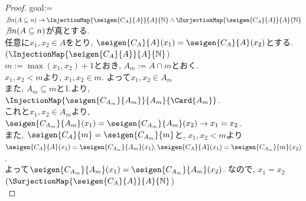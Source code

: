 \begin{proof}
 goal:= $\not \exists n (A \subseteq n) \rightarrow \InjectionMap{\seigen{C_A}{A}}{A}{\mathbb{N}} \land \SurjectionMap{\seigen{C_A}{A}}{A}{\mathbb{N}}$\\

 $\not \exists n (A \subseteq n)$が真とする.\\
 任意に$x_1, x_2 \in A$をとり,
 $\seigen {C_A}{A}(x_1) = \seigen{C_A}{A}(x_2)$とする.\\
 
 $(\InjectionMap{\seigen{C_A}{A}}{A}{\mathbb{N}}$)\\
 $m:= \operatorname{max}(x_1, x_2) + 1$とおき,
 $A_m := A \cap m$とおく.\\
 $x_1, x_2 < m$より,
 $x_1, x_2 \in m$.
 よって$x_1, x_2 \in A_m$\\
 また,
 $A_m \subseteq m$と1.より,
$\InjectionMap{\seigen {C_{A_m}}{A_m}}{A_m}{\Card{A_m}}$.\\
 これと$x_1, x_2 \in A_m$より,
 $\seigen{C_{A_m}}{A_m}(x_1) = \seigen{C_{A_m}}{A_m}(x_2) \rightarrow x_1 = x_2$.\\
 また,
 $\seigen {C_A}{m} = \seigen {C_{A_m}}{m}$と,
 $x_1, x_2 < m$より\\
 $\seigen {C_A}{A}(x_1) = \seigen {C_{A_m}}{A_m}(x_1), \seigen {C_A}{A}(x_1) = \seigen {C_{A_m}}{m}(x_2)$.\\
 よって$\seigen{C_{A_m}}{A_m}(x_1) = \seigen{C_{A_m}}{A_m}(x_2)$.
 なので,
 $x_1 = x_2$\\
 
 $(\SurjectionMap{\seigen{C_A}{A}}{A}{\mathbb{N}}$)\\

\end{proof}
